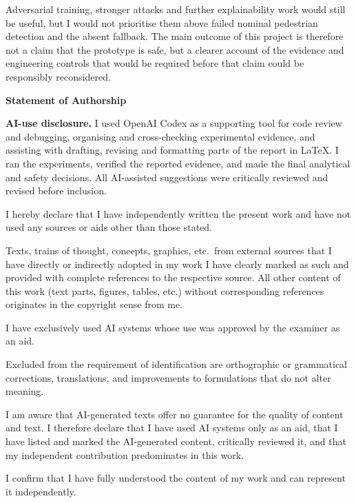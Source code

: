 \documentclass[nologo,a4paper,12pt]{article}
\begin{document}
Adversarial training, stronger attacks and further explainability work would still be useful, but I
would not prioritise them above failed nominal pedestrian detection and the absent fallback. The main
outcome of this project is therefore not a claim that the prototype is safe, but a clearer account of
the evidence and engineering controls that would be required before that claim could be responsibly
reconsidered.

\clearpage
\thispagestyle{empty}
\begin{center}
  {\large\bfseries\color{mls@blue}Statement of Authorship}
\end{center}

\medskip
\textbf{AI-use disclosure.} I used OpenAI Codex as a supporting tool for code review and debugging,
organising and cross-checking experimental evidence, and assisting with drafting, revising and
formatting parts of the report in LaTeX. I ran the experiments, verified the reported evidence,
and made the final analytical and safety decisions. All AI-assisted suggestions were critically
reviewed and revised before inclusion.

\medskip
I hereby declare that I have independently written the present work and have not used any sources or aids other than
those stated.

Texts, trains of thought, concepts, graphics, etc.\ from external sources that I have directly or
indirectly adopted in my work I have clearly marked as such and provided with complete references
to the respective source. All other content of this work (text parts, figures, tables, etc.)
without corresponding references originates in the copyright sense from me.

I have exclusively used AI systems whose use was approved by the examiner as an aid.

Excluded from the requirement of identification are orthographic or grammatical corrections,
translations, and improvements to formulations that do not alter meaning.

I am aware that AI-generated texts offer no guarantee for the quality of content and text.
I therefore declare that I have used AI systems only as an aid, that I have listed and marked the
AI-generated content, critically reviewed it, and that my independent contribution predominates in
this work.

I confirm that I have fully understood the content of my work and can represent it independently.
\end{document}
